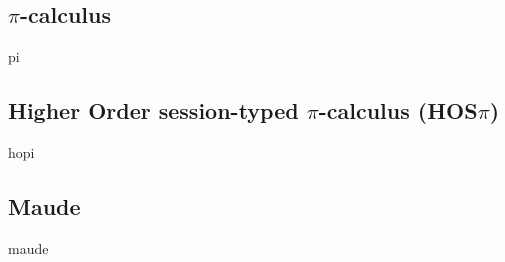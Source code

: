 \subsection{\texorpdfstring{$\pi$}{pi}-calculus}
\label{pisyn}
{pi}

\subsection{Higher Order session-typed \texorpdfstring{$\pi$}{pi}-calculus (HOS\texorpdfstring{$\pi$}{pi})}
\label{hopisyn}
{hopi}

\subsection{Maude}
\label{minmaude}
{maude}


